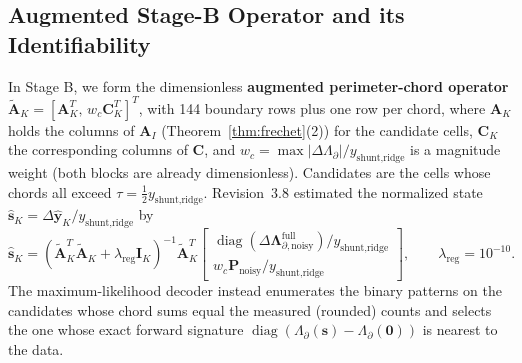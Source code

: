 \documentclass[11pt,a4paper]{article}
\theoremstyle{definition}
\theoremstyle{remark}
\begin{document}
\subsection{Augmented Stage-B Operator and its Identifiability}
In Stage B, we form the dimensionless \textbf{augmented perimeter-chord operator} $\widetilde{\mathbf{A}}_K = [\mathbf{A}_K^T, \, w_c\mathbf{C}_K^T]^T$, with 144 boundary rows plus one row per chord, where $\mathbf{A}_K$ holds the columns of $\mathbf{A}_I$ (Theorem~\ref{thm:frechet}(2)) for the candidate cells, $\mathbf{C}_K$ the corresponding columns of $\mathbf{C}$, and $w_c = \max|\Delta\Lambda_\partial|/y_{\text{shunt,ridge}}$ is a magnitude weight (both blocks are already dimensionless). Candidates are the cells whose chords all exceed $\tau = \tfrac12 y_{\text{shunt,ridge}}$. Revision~3.8 estimated the normalized state $\hat{\mathbf{s}}_K = \Delta\hat{\mathbf{y}}_K / y_{\text{shunt,ridge}}$ by
\begin{equation}\label{eq:ridge}
\hat{\mathbf{s}}_K = \left(\widetilde{\mathbf{A}}_K^T \widetilde{\mathbf{A}}_K + \lambda_{\text{reg}}\mathbf{I}_K\right)^{-1} \widetilde{\mathbf{A}}_K^T \begin{bmatrix} \operatorname{diag}\left(\Delta\mathbf{\Lambda}_{\partial,\text{noisy}}^{\text{full}}\right) / y_{\text{shunt,ridge}} \\ w_c \mathbf{P}_{\text{noisy}} / y_{\text{shunt,ridge}} \end{bmatrix},\qquad \lambda_{\text{reg}} = 10^{-10}.
\end{equation}
The maximum-likelihood decoder instead enumerates the binary patterns on the candidates whose chord sums equal the measured (rounded) counts and selects the one whose exact forward signature $\operatorname{diag}(\Lambda_\partial(\mathbf{s})-\Lambda_\partial(\mathbf{0}))$ is nearest to the data.
\end{document}
